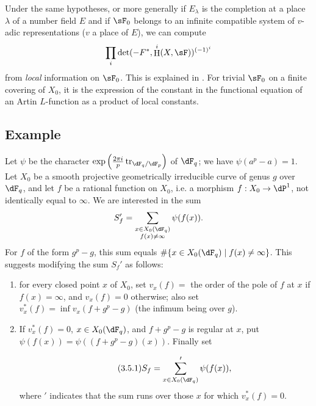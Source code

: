 \documentclass[oneside]{book}
\DeclareMathOperator{\h}{H}
\DeclareMathOperator{\tr}{tr}
\newcounter{char}
\theoremstyle{sga-source}
\theoremstyle{sga-source-dash}
\theoremstyle{sga-source-dotdash}
\theoremstyle{sga-source-number-note-dash}
\theoremstyle{sga-source-note-number-dotdash}
\theoremstyle{sga-source-example-dotdash}
\theoremstyle{sga-source-inline-number}
\theoremstyle{sga-source-bare-number}
\theoremstyle{sga-source}
\newcommand{\PrintPage}[1]{}\newcommand{\MathPage}[1]{}\newcommand{\PrintCite}[2]{#1}\newcommand{\var}[3]{#2}
\begin{document}
Under the same hypotheses, or more generally if $E_\lambda$ is the 
completion at a place $\lambda$ of a number field $E$ and if $\sF_0$ 
belongs to an infinite compatible system of $v$-adic representations 
($v$ a place of $E$), we can compute 
\[
  \prod_i \det(-F^\ast,\h^i(X,\sF))^{(-1)^i} 
\]
from \emph{local} information on $\sF_0$. This is explained in 
\cite{de73}. For trivial $\sF_0$ on a finite covering of $X_0$, it is 
the expression of the constant in the functional equation of an Artin 
$L$-function as a product of local constants. 





\subsection{Example}\label{VI:3-5}

Let $\psi$ be the character 
$\exp\left(\frac{2\pi i}{p} \tr_{\dF_q/\dF_p}\right)$ of $\dF_q$; we have 
$\var{\psi(a^p-a)=0}{\psi(a^p-a)=1}{S45-SOL-0760}$. Let $X_0$ be a smooth projective geometrically 
irreducible curve of genus $g$ over $\dF_q$, and let $f$ be a rational function on 
$X_0$, i.e. a morphism $f:X_0 \to \dP^1$, not identically equal to 
$\infty$. We are interested in the sum 
\[
  S_f' = \sum_{\substack{x\in X_0(\dF_q) \\ f(x)\ne \infty}} \psi(f(x)) 
  \text{.}
\]
\var{This sum is zero for $f$ of the form $g^p-g$.}{For $f$ of the form $g^p-g$, this sum equals $\#\{x\in X_0(\dF_q)\mid f(x)\ne\infty\}$.}{S45-SOL-0763} This suggests modifying 
the sum $S_f'$ as follows: 
\begin{enumerate}[\indent a)]
  \item \var{for every closed point $s$}{for every closed point $x$}{S45-SOL-0765} of $X_0$, set $v_x(f) = $ the order of the 
    pole of $f$ at $x$ if $f(x)=\infty$, and $v_x(f)=0$ otherwise; also set 
    $v_x^\ast(f) = \inf v_x(f+g^p-g)$ (the infimum being over $g$). 
  \item If $v_x^\ast(f)=0$, $x\in X_0(\dF_q)$, and $f+g^p-g$ is 
    regular at $x$, put $\psi(f(x)) = \psi((f+g^p-g)(x))$. Finally set 
    \PrintPage{191}
\begin{equation*}\tag{3.5.1}\label{VI:eq:3-5-1}
      S_f = \sum'_{x\in X_0(\dF_q)} \psi(f(x)) \text{,}
    \end{equation*}
    where $\prime$ indicates that the sum runs over those $x$ for which 
    $v_x^\ast(f)=0$. 
\end{enumerate}
\end{document}
